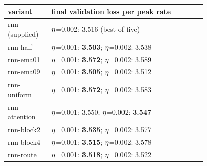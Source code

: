 \begin{tabular}{lp{0.78\linewidth}}\toprule
variant & final validation loss per peak rate\\\midrule
rnn (supplied) & $\eta$=0.002: 3.516 (best of five) \\
rnn-half & $\eta$=0.001: \textbf{3.503}; $\eta$=0.002: 3.538 \\
rnn-ema01 & $\eta$=0.001: \textbf{3.572}; $\eta$=0.002: 3.589 \\
rnn-ema09 & $\eta$=0.001: \textbf{3.505}; $\eta$=0.002: 3.512 \\
rnn-uniform & $\eta$=0.001: \textbf{3.572}; $\eta$=0.002: 3.583 \\
rnn-attention & $\eta$=0.001: 3.550; $\eta$=0.002: \textbf{3.547} \\
rnn-block2 & $\eta$=0.001: \textbf{3.535}; $\eta$=0.002: 3.577 \\
rnn-block4 & $\eta$=0.001: \textbf{3.515}; $\eta$=0.002: 3.578 \\
rnn-route & $\eta$=0.001: \textbf{3.518}; $\eta$=0.002: 3.522 \\
\bottomrule\end{tabular}

